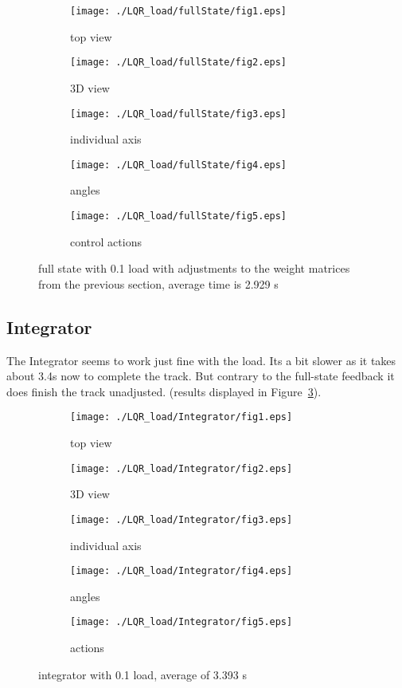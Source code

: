 \begin{figure}[H]
	\centering
	\begin{subfigure}[b]{0.3\textwidth}
		\texttt{[image: ./LQR\_load/fullState/fig1.eps]}
		\caption{top view}
	\end{subfigure}
	\begin{subfigure}[b]{0.3\textwidth}
		\texttt{[image: ./LQR\_load/fullState/fig2.eps]}
		\caption{3D view}
		\label{fig: full state , strong enough }
	\end{subfigure}
	\begin{subfigure}[b]{0.3\textwidth}
		\texttt{[image: ./LQR\_load/fullState/fig3.eps]}
		\caption{individual axis}
	\end{subfigure}
	\begin{subfigure}[b]{0.3\textwidth}
		\texttt{[image: ./LQR\_load/fullState/fig4.eps]}
		\caption{angles}
	\end{subfigure}
	\begin{subfigure}[b]{0.3\textwidth}
		\texttt{[image: ./LQR\_load/fullState/fig5.eps]}
		\caption{control actions}
	\end{subfigure}
	\caption{full state with 0.1 load with adjustments to the weight matrices from the previous section, average time is 2.929 s }\label{fig:full state with load}
\end{figure}

\subsection{Integrator}
The Integrator seems to work just fine with the load. Its a bit slower as it takes about 3.4s now to complete the track. But contrary to the full-state feedback it does finish the track unadjusted. (results displayed in Figure~\ref{fig:Integrator with load}).

\begin{figure}[H]
	\centering
	\begin{subfigure}[b]{0.3\textwidth}
		\texttt{[image: ./LQR\_load/Integrator/fig1.eps]}
		\caption{top view}
	\end{subfigure}
	\begin{subfigure}[b]{0.3\textwidth}
		\texttt{[image: ./LQR\_load/Integrator/fig2.eps]}
		\caption{3D view}
	\end{subfigure}
	\begin{subfigure}[b]{0.3\textwidth}
		\texttt{[image: ./LQR\_load/Integrator/fig3.eps]}
		\caption{individual axis}
	\end{subfigure}
	\begin{subfigure}[b]{0.3\textwidth}
		\texttt{[image: ./LQR\_load/Integrator/fig4.eps]}
		\caption{angles}
	\end{subfigure}
	\begin{subfigure}[b]{0.3\textwidth}
		\texttt{[image: ./LQR\_load/Integrator/fig5.eps]}
		\caption{actions}
	\end{subfigure}
	\caption{integrator with 0.1 load, average of 3.393 s}\label{fig:Integrator with load}
\end{figure}


